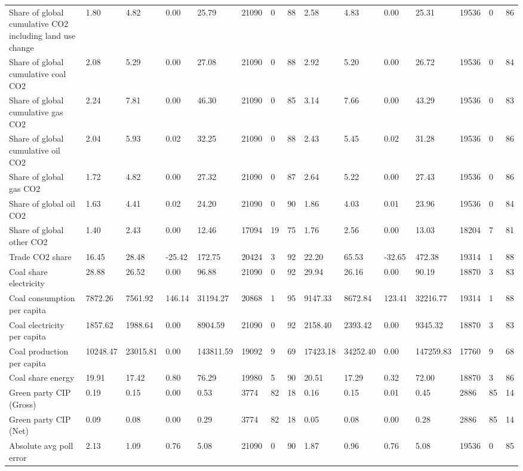 \begin{longtable}{lllllllllllllll}
Share of global cumulative CO2 including land use change & 1.80 & 4.82 & 0.00 & 25.79 & 21090 & 0 & 88 & 2.58 & 4.83 & 0.00 & 25.31 & 19536 & 0 & 86\\
Share of global cumulative coal CO2 & 2.08 & 5.29 & 0.00 & 27.08 & 21090 & 0 & 88 & 2.92 & 5.20 & 0.00 & 26.72 & 19536 & 0 & 84\\
Share of global cumulative gas CO2 & 2.24 & 7.81 & 0.00 & 46.30 & 21090 & 0 & 85 & 3.14 & 7.66 & 0.00 & 43.29 & 19536 & 0 & 83\\
Share of global cumulative oil CO2 & 2.04 & 5.93 & 0.02 & 32.25 & 21090 & 0 & 88 & 2.43 & 5.45 & 0.02 & 31.28 & 19536 & 0 & 86\\
\addlinespace
Share of global gas CO2 & 1.72 & 4.82 & 0.00 & 27.32 & 21090 & 0 & 87 & 2.64 & 5.22 & 0.00 & 27.43 & 19536 & 0 & 86\\
Share of global oil CO2 & 1.63 & 4.41 & 0.02 & 24.20 & 21090 & 0 & 90 & 1.86 & 4.03 & 0.01 & 23.96 & 19536 & 0 & 84\\
Share of global other CO2 & 1.40 & 2.43 & 0.00 & 12.46 & 17094 & 19 & 75 & 1.76 & 2.56 & 0.00 & 13.03 & 18204 & 7 & 81\\
Trade CO2 share & 16.45 & 28.48 & -25.42 & 172.75 & 20424 & 3 & 92 & 22.20 & 65.53 & -32.65 & 472.38 & 19314 & 1 & 88\\
Coal share electricity & 28.88 & 26.52 & 0.00 & 96.88 & 21090 & 0 & 92 & 29.94 & 26.16 & 0.00 & 90.19 & 18870 & 3 & 83\\
\addlinespace
Coal consumption per capita & 7872.26 & 7561.92 & 146.14 & 31194.27 & 20868 & 1 & 95 & 9147.33 & 8672.84 & 123.41 & 32216.77 & 19314 & 1 & 88\\
Coal electricity per capita & 1857.62 & 1988.64 & 0.00 & 8904.59 & 21090 & 0 & 92 & 2158.40 & 2393.42 & 0.00 & 9345.32 & 18870 & 3 & 83\\
Coal production per capita & 10248.47 & 23015.81 & 0.00 & 143811.59 & 19092 & 9 & 69 & 17423.18 & 34252.40 & 0.00 & 147259.83 & 17760 & 9 & 68\\
Coal share energy & 19.91 & 17.42 & 0.80 & 76.29 & 19980 & 5 & 90 & 20.51 & 17.29 & 0.32 & 72.00 & 18870 & 3 & 86\\
Green party CIP (Gross) & 0.19 & 0.15 & 0.00 & 0.53 & 3774 & 82 & 18 & 0.16 & 0.15 & 0.01 & 0.45 & 2886 & 85 & 14\\
\addlinespace
Green party CIP (Net) & 0.09 & 0.08 & 0.00 & 0.29 & 3774 & 82 & 18 & 0.05 & 0.08 & 0.00 & 0.28 & 2886 & 85 & 14\\
Absolute avg poll error & 2.13 & 1.09 & 0.76 & 5.08 & 21090 & 0 & 90 & 1.87 & 0.96 & 0.76 & 5.08 & 19536 & 0 & 85\\

\end{longtable}
